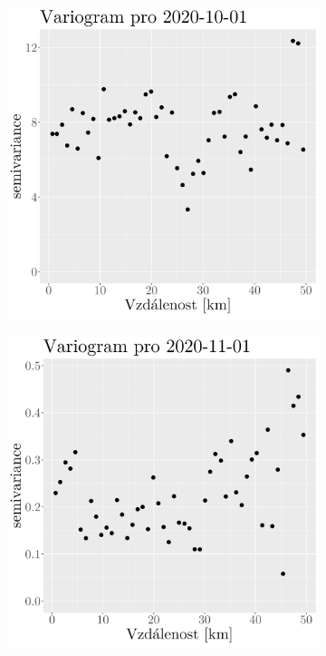 \begin{figure}
\begin{subfigure}{0.30\textwidth}
		\caption{}
		\label{fig:variogram9}
	\end{subfigure}
\hfill
	\begin{subfigure}{0.30\textwidth}
		\includegraphics[width=\textwidth]{img/ch2/variograms/variogram_max15cm10.png}
		\caption{}
		\label{fig:variogram10}
	\end{subfigure}
\hfill
	\begin{subfigure}{0.30\textwidth}
		\includegraphics[width=\textwidth]{img/ch2/variograms/variogram_max15cm11.png}

\end{subfigure}
\end{figure}
